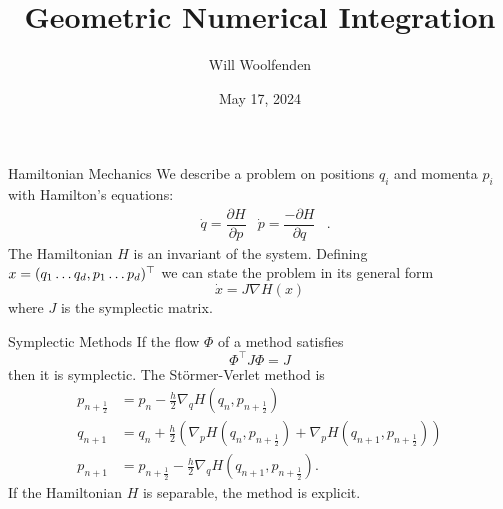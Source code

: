 \documentclass[aspectratio=169]{beamer}
\title{Geometric Numerical Integration}
\author{Will Woolfenden}
\date{May 17, 2024}
\begin{document}
\maketitle

\begin{frame}{Hamiltonian Mechanics}
	We describe a problem on positions $q_i$ and momenta $p_i$ with Hamilton's equations: \pause
	\begin{align*}
		&\dot{q} = \dfrac{\partial H}{\partial p}
		&
		\dot{p} = \dfrac{-\partial H}{\partial q}&.	
	\end{align*} \pause
	The Hamiltonian $H$ is an invariant of the system. \pause
	Defining $x = (q_1 \mathellipsis q_d, p_1 \mathellipsis p_d)^\top$ we can state the problem in its general form
	\begin{equation*}
		\dot{x} = J \nabla H(x)
	\end{equation*}
	where $J$ is the symplectic matrix.
\end{frame}

\begin{frame}{Symplectic Methods}
	If the flow $\Phi$ of a method satisfies
	\begin{equation*}
		\Phi^\top J \Phi = J
	\end{equation*}
	then it is symplectic. \pause 
	The St\"ormer-Verlet method is
	\begin{align*}
		p_{n+\frac{1}{2}} &= p_n - \frac{h}{2}\nabla_q H \left( q_n, p_{n+\frac{1}{2}} \right) \\
		q_{n+1} &= q_n + \frac{h}{2}\left( \nabla_p H \left( q_n, p_{n+\frac{1}{2}} \right) + \nabla_p H \left(q_{n+1}, p_{n+\frac{1}{2}} \right) \right) \\
		p_{n+1} &= p_{n+\frac{1}{2}} - \frac{h}{2} \nabla_q H \left( q_{n+1}, p_{n+\frac{1}{2}} \right).
	\end{align*} \pause
	If the Hamiltonian $H$ is separable, the method is explicit.
\end{frame}
\end{document}
